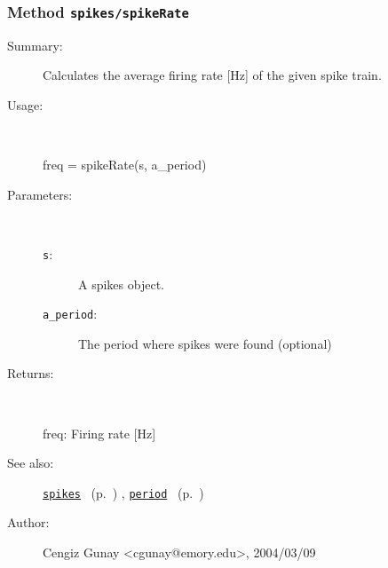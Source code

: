 \subsubsection[Method \texttt{spikeRate}]{Method \texttt{spikes/spikeRate}}%
%
\label{ref_spikes__spikeRate}%
\hypertarget{ref_spikes__spikeRate}{}%
\begin{description}
\item[Summary:]Calculates the average firing rate [Hz] of the given spike train.
%
\item[Usage:]~%
\begin{lyxcode}%
freq = spikeRate(s, a\_period)
%
\end{lyxcode}%
%
%
\item[Parameters:]~
\begin{description}%
\item[\texttt{s}:]
 A spikes object.
\item[\texttt{a\_period}:]
 The period where spikes were found (optional)
\end{description}%
%
\item[Returns:]~

	freq: Firing rate [Hz]
%
%
\item[See also:]%
\hyperlink{ref_spikes}{\texttt{spikes}}%
\ (p.~\pageref{ref_spikes})%
%
, \hyperlink{ref_period}{\texttt{period}}%
\ (p.~\pageref{ref_period})%
%
%
\item[Author:]%
Cengiz Gunay <cgunay@emory.edu>, 2004/03/09%
\end{description}
\methodline%
